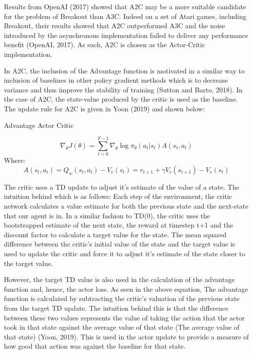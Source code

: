 \documentclass{article}
\begin{document}
Results from OpenAI (2017) showed that A2C may be a more suitable candidate for the problem of Breakout than A3C. Indeed on a set of Atari games, including Breakout, their results showed that A2C outperformed A3C and the noise introduced by the asynchronous implementation failed to deliver any performance benefit (OpenAI, 2017). As such, A2C is chosen as the Actor-Critic implementation.

In A2C, the inclusion of the Advantage function is motivated in a similar way to inclusion of baselines in other policy gradient methods which is to decrease variance and thus improve the stability of training (Sutton and Barto, 2018). In the case of A2C, the state-value produced by the critic is used as the baseline. The update rule for A2C is given in Yoon (2019) and shown below:

Advantage Actor Critic

\begin{equation}
\nabla_{\theta} J(\theta) = \sum_{t=0}^{T-1}\nabla_{\theta}\log{\pi_{\theta}}(a_{t} | s_{t}) A(s_{t}, a_{t})
\end{equation}
Where:
\begin{equation}
A(s_{t}, a_{t}) = Q_{w}(s_{t}, a_{t}) - V_{v}(s_{t}) = r_{t+1} + \gamma V_{v}(s_{t+1}) - V_{v}(s_{t})
\end{equation}


The critic uses a TD update to adjust it's estimate of the value of a state. The intuition behind which is as follows: Each step of the environment, the critic network calculates a value estimate for both the previous state and the next-state that our agent is in. In a similar fashion to TD(0), the critic uses the bootstrapped estimate of the next state, the reward at timestep t+1 and the discount factor to calculate a target value for the state. The mean squared difference between the critic's initial value of the state and the target value is used to update the critic and force it to adjust it's estimate of the state closer to the target value.

However, the target TD value is also used in the calculation of the advantage function and, hence, the actor loss. As seen in the above equation, The advantage function is calculated by subtracting the critic's valuation of the previous state from the target TD update. The intuition behind this is that the difference between these two values represents the value of taking the action that the actor took in that state against the average value of that state (The average value of that state) (Yoon, 2019). This is used in the actor update to provide a measure of how good that action was against the baseline for that state.
\end{document}
